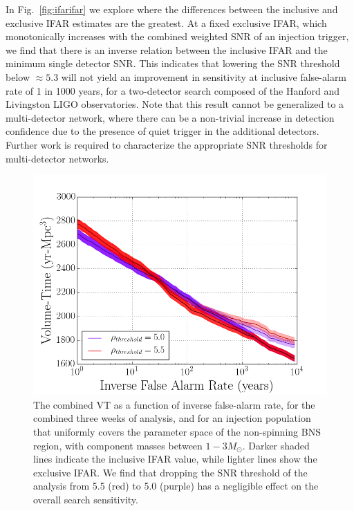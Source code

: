 In Fig.~\ref{fig:ifarifar} we explore where the differences between the inclusive and exclusive IFAR estimates are the greatest. At a fixed exclusive IFAR, which monotonically increases with the combined weighted SNR of an injection trigger, we find that there is an inverse relation between the inclusive IFAR and the minimum single detector SNR. This indicates that lowering the SNR threshold below $\approx 5.3$ will not yield an improvement in sensitivity at inclusive false-alarm rate of 1 in 1000 years, for a two-detector search composed of the Hanford and Livingston LIGO observatories. Note that this result cannot be generalized to a multi-detector network, where there can be a non-trivial increase in detection confidence due to the presence of quiet trigger in the additional detectors. Further work is required to characterize the appropriate SNR thresholds for multi-detector networks.



\begin{figure}
\centering
\includegraphics[width=1.0\textwidth]{papers/bns_o1_dev/figures/snr_combined.png}
\caption{\label{fig:snrthreshold} 
The combined VT as a function of inverse false-alarm rate, for the combined three weeks of analysis, and for an injection population that uniformly covers the parameter space of the non-spinning BNS region, with component masses between $1- 3M_\odot$. Darker shaded lines indicate the inclusive IFAR value, while lighter lines show the exclusive IFAR. We find that dropping the SNR threshold of the analysis from 5.5 (red) to 5.0 (purple) has a negligible effect on the overall search sensitivity.
}
\end{figure}

